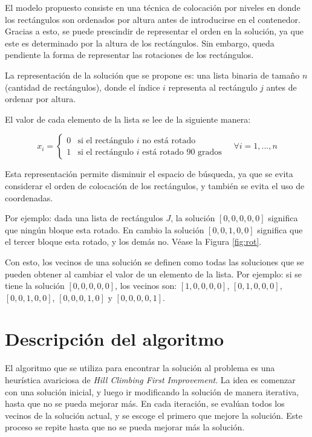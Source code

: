 \documentclass[letter, 10pt]{article}
\begin{document}
El modelo propuesto consiste en una técnica de colocación por niveles en donde los rectángulos son ordenados por altura antes de introducirse en el contenedor. Gracias a esto, se puede prescindir de representar el orden en la solución, ya que este es determinado por la altura de los rectángulos. Sin embargo, queda pendiente la forma de representar las rotaciones de los rectángulos.

La representación de la solución que se propone es: una lista binaria de tamaño $n$ (cantidad de rectángulos), donde el índice $i$ representa al rectángulo $j$ antes de ordenar por altura.

El valor de cada elemento de la lista se lee de la siguiente manera:

\begin{equation}
    x_i = \begin{cases}
        0 & \text{si el rectángulo $i$ no está rotado}        \\
        1 & \text{si el rectángulo $i$ está rotado 90 grados}
    \end{cases} \quad \forall i = 1,...,n
\end{equation}

Esta representación permite disminuir el espacio de búsqueda, ya que se evita considerar el orden de colocación de los rectángulos, y también se evita el uso de coordenadas.

Por ejemplo: dada una lista de rectángulos $J$, la solución $[0,0,0,0,0]$ significa que ningún bloque esta rotado. En cambio la solución $[0,0,1,0,0]$ significa que el tercer bloque esta rotado, y los demás no. Véase la Figura \ref{fig:rot}.

Con esto, los vecinos de una solución se definen como todas las soluciones que se pueden obtener al cambiar el valor de un elemento de la lista. Por ejemplo: si se tiene la solución $[0,0,0,0,0]$, los vecinos son: $[1,0,0,0,0]$, $[0,1,0,0,0]$, $[0,0,1,0,0]$, $[0,0,0,1,0]$ y $[0,0,0,0,1]$.





\section{Descripción del algoritmo}

El algoritmo que se utiliza para encontrar la solución al problema es una heurística avariciosa de \textit{Hill Climbing First Improvement}. La idea es comenzar con una solución inicial, y luego ir modificando la solución de manera iterativa, hasta que no se pueda mejorar más. En cada iteración, se evalúan todos los vecinos de la solución actual, y se escoge el primero que mejore la solución. Este proceso se repite hasta que no se pueda mejorar más la solución.
\end{document}
